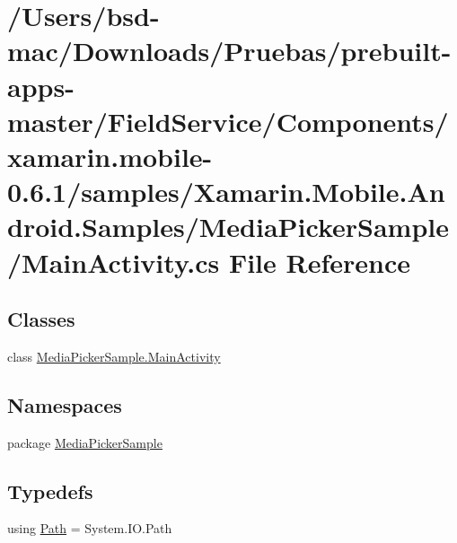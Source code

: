 \hypertarget{xamarin_8mobile-0_86_81_2samples_2_xamarin_8_mobile_8_android_8_samples_2_media_picker_sample_2_main_activity_8cs}{\section{/\+Users/bsd-\/mac/\+Downloads/\+Pruebas/prebuilt-\/apps-\/master/\+Field\+Service/\+Components/xamarin.mobile-\/0.6.1/samples/\+Xamarin.Mobile.\+Android.\+Samples/\+Media\+Picker\+Sample/\+Main\+Activity.cs File Reference}
\label{xamarin_8mobile-0_86_81_2samples_2_xamarin_8_mobile_8_android_8_samples_2_media_picker_sample_2_main_activity_8cs}
}
\subsection*{Classes}
\begin{DoxyCompactItemize}
\item 
class \hyperlink{class_media_picker_sample_1_1_main_activity}{Media\+Picker\+Sample.\+Main\+Activity}
\end{DoxyCompactItemize}
\subsection*{Namespaces}
\begin{DoxyCompactItemize}
\item 
package \hyperlink{namespace_media_picker_sample}{Media\+Picker\+Sample}
\end{DoxyCompactItemize}
\subsection*{Typedefs}
\begin{DoxyCompactItemize}
\item 
using \hyperlink{xamarin_8mobile-0_86_81_2samples_2_xamarin_8_mobile_8_android_8_samples_2_media_picker_sample_2_main_activity_8cs_a5d3f395d3257bcd58335037355f0d7cc}{Path} = System.\+I\+O.\+Path
\end{DoxyCompactItemize}


